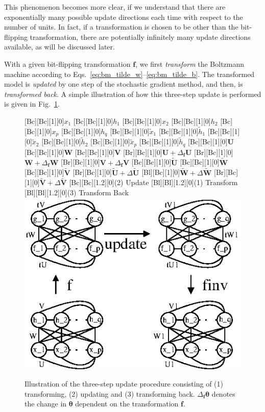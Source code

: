 \documentclass[dissertation,nocontribution,draft*]{aaltoseries}
\newcommand{\vect}[1]{\mathbf{#1}}
\newcommand{\vects}[1]{\boldsymbol{#1}}
\newcommand{\matr}[1]{\mathbf{#1}}
\newcommand{\vf}[0]{\vect{f}}
\newcommand{\mW}[0]{\matr{W}}
\newcommand{\mU}[0]{\matr{U}}
\newcommand{\mV}[0]{\matr{V}}
\newcommand{\TT}[0]{{\vects{\theta}}}
\begin{document}
This phenomenon becomes more clear, if we understand that
there are exponentially many possible update directions each
time with respect to the number of units. In fact, if a
transformation is chosen to be other than the bit-flipping
transformation, there are potentially infinitely many update
directions available, as will be discussed later.

With a given bit-flipping transformation $\vf$, we first
\textit{transform} the Boltzmann machine according to
Eqs.~\eqref{eq:bm_tilde_w}--\eqref{eq:bm_tilde_b}. The
transformed model is \textit{updated} by one step of the
stochastic gradient method, and then, is \textit{transformed
back}. A simple illustration of how this three-step update
is performed is given in
Fig.~\ref{fig:bm_three_step_update}.

\begin{figure}[t]
    \centering
    [Bc][Bc][1][0]{$x_1$}
    [Bc][Bc][1][0]{$h_1$}
    [Bc][Bc][1][0]{$x_2$}
    [Bc][Bc][1][0]{$h_2$}
    [Bc][Bc][1][0]{$x_p$}
    [Bc][Bc][1][0]{$h_q$}
    [Bc][Bc][1][0]{$\tilde{x}_1$}
    [Bc][Bc][1][0]{$\tilde{h}_1$}
    [Bc][Bc][1][0]{$\tilde{x}_2$}
    [Bc][Bc][1][0]{$\tilde{h}_2$}
    [Bc][Bc][1][0]{$\tilde{x}_p$}
    [Bc][Bc][1][0]{$\tilde{h}_q$}
    [Bc][Bc][1][0]{$\mU$}
    [Bc][Bc][1][0]{$\mW$}
    [Bc][Bc][1][0]{$\mV$}
    [Br][Bc][1][0]{$\mU+\Delta_\vf \mU$}
    [Br][Bc][1][0]{$\mW+\Delta_\vf \mW$}
    [Br][Bc][1][0]{$\mV+\Delta_\vf \mV$}
    [Bc][Bc][1][0]{$\tilde{\mU}$}
    [Bc][Bc][1][0]{$\tilde{\mW}$}
    [Bc][Bc][1][0]{$\tilde{\mV}$}
    [Br][Bc][1][0]{$\tilde{\mU}+\Delta\tilde{\mU}$}
    [Bl][Bc][1][0]{$\tilde{\mW}+\Delta\tilde{\mW}$}
    [Br][Bc][1][0]{$\tilde{\mV}+\Delta\tilde{\mV}$}
    [Bc][Bc][1.2][0]{(2) Update}
    [Bl][Bl][1.2][0]{(1) Transform}
    [Bl][Bl][1.2][0]{(3) Transform Back}
    \includegraphics[width=0.8\columnwidth]{figures/fbm_3step.eps}
    \caption{Illustration of the three-step update procedure
    consisting of (1) transforming, (2) updating and (3)
    transforming back. $\Delta_\vf \TT$ denotes the change
    in $\TT$ dependent on the transformation $\vf$.}
    \label{fig:bm_three_step_update}
\end{figure}
\end{document}
